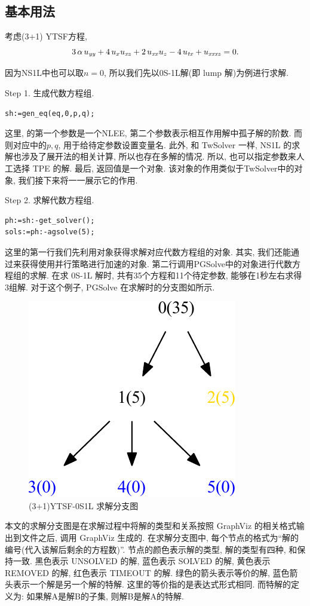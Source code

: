 \subsection{基本用法}
考虑(3+1) YTSF方程\CITEcaYTSF,
\begin{equation}
    3\,\alpha\,u_{{{\it yy}}}+4\,u_{{x}}u_{{{\it xz}}}+2\,u_{{{\it xx}}}u_{{z}}-4\,u_{{{\it tx}}}+u_{{{\it xxxz}}}=0. 
\end{equation}

因为NS1L中也可以取$n=0$, 所以我们先以0S-1L解(即 lump 解)为例进行求解. 

Step 1. 生成代数方程组.
\begin{verbatim}
sh:=gen_eq(eq,0,p,q);
\end{verbatim}
这里,  的第一个参数是一个NLEE, 第二个参数表示相互作用解中孤子解的阶数. 而则对应中的$p,q$, 用于给待定参数设置变量名. 此外, 和 TwSolver 一样, NS1L 的求解也涉及了\Painleve{}展开法的相关计算, 所以也存在多解的情况. 所以, 也可以指定参数来人工选择 TPE 的解. 最后, 返回值是一个对象. 该对象的作用类似于TwSolver中的对象, 我们接下来将一一展示它的作用. 

Step 2. 求解代数方程组.
\begin{verbatim}
ph:=sh:-get_solver();
sols:=ph:-agsolve(5);
\end{verbatim}
这里的第一行我们先利用对象获得求解对应代数方程组的对象. 其实, 我们还能通过来获得使用并行策略进行加速的对象. 第二行调用PGSolve中的对象进行代数方程组的求解. 在求 0S-1L 解时, 共有35个方程和11个待定参数, 能够在1秒左右求得3组解. 对于这个例子, PGSolve 在求解时的分支图如所示. 

\begin{figure}[htbp]
\centering
\includegraphics[width=.3\textwidth]{fig/0S1L.pdf}
\caption{(3+1)YTSF-0S1L 求解分支图}\label{sb0}
\end{figure}

本文的求解分支图是在求解过程中将解的类型和关系按照 GraphViz\cite{ellson2001graphviz} 的相关格式输出到文件之后, 调用 GraphViz 生成的. 在求解分支图中, 每个节点的格式为``解的编号(代入该解后剩余的方程数)''. 节点的颜色表示解的类型, 解的类型有四种, 和保持一致. 黑色表示 UNSOLVED 的解, 蓝色表示 SOLVED 的解, 黄色表示 REMOVED 的解, 红色表示 TIMEOUT 的解. 绿色的箭头表示等价的解, 蓝色箭头表示一个解是另一个解的特解. 这里的等价指的是表达式形式相同. 而特解的定义为: 如果解A是解B的子集, 则解B是解A的特解. 

